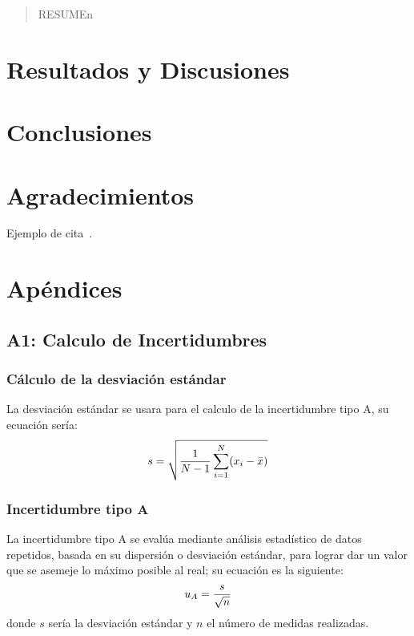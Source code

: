 \documentclass[10pt,onecolumn]{article}
\begin{document}

\tableofcontents %
\newpage

\HRule{0.5pt} %

\begin{abstract}
RESUMEn
\end{abstract}


\section{Resultados y Discusiones}

\section{Conclusiones}

\section{Agradecimientos}
Ejemplo de cita~\cite{Mandelbrot2009}.


\section{Apéndices}
\subsection{A1: Calculo de Incertidumbres} 
\subsubsection{Cálculo de la desviación estándar}
La desviación estándar se usara para el calculo de la incertidumbre tipo A, su ecuación sería:
\begin{equation}\centering
    s = \sqrt{\dfrac{1}{N - 1} \sum_{i=1}^{N} (x_i - \bar{x})}
\end{equation}

\subsubsection{Incertidumbre tipo A}
La incertidumbre tipo A se evalúa mediante análisis estadístico de datos repetidos, basada en su dispersión o desviación estándar, para lograr dar un valor que se asemeje lo máximo posible al real; su ecuación es la siguiente:
\begin{equation}\centering
u_A = \dfrac{s}{\sqrt{n}}
\end{equation}
donde $s$ sería la desviación estándar y $n$ el número de medidas realizadas.
\end{document}

